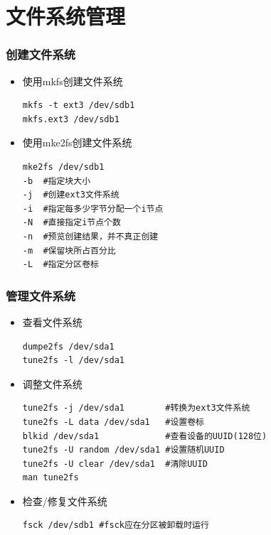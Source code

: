 \documentclass[xcolor=svgnames,presentation]{beamer}
\begin{document}
\section{文件系统管理}
\label{sec-2}
\begin{frame}[fragile]
\frametitle{创建文件系统}
\label{sec-2-1}
\begin{itemize}

\item 使用mkfs创建文件系统\\
\label{sec-2-1-1}%
\begin{verbatim}
mkfs -t ext3 /dev/sdb1
mkfs.ext3 /dev/sdb1
\end{verbatim}

\item 使用mke2fs创建文件系统\\
\label{sec-2-1-2}%
\begin{verbatim}
mke2fs /dev/sdb1
-b  #指定块大小
-j  #创建ext3文件系统
-i  #指定每多少字节分配一个i节点
-N  #直接指定i节点个数
-n  #预览创建结果，并不真正创建
-m  #保留块所占百分比
-L  #指定分区卷标
\end{verbatim}
\end{itemize} %
\end{frame}
\begin{frame}[fragile]
\frametitle{管理文件系统}
\label{sec-2-2}
\begin{itemize}

\item 查看文件系统\\
\label{sec-2-2-1}%
\begin{verbatim}
dumpe2fs /dev/sda1
tune2fs -l /dev/sda1
\end{verbatim}

\item 调整文件系统\\
\label{sec-2-2-2}%
\begin{verbatim}
tune2fs -j /dev/sda1        #转换为ext3文件系统
tune2fs -L data /dev/sda1   #设置卷标
blkid /dev/sda1             #查看设备的UUID(128位)
tune2fs -U random /dev/sda1 #设置随机UUID
tune2fs -U clear /dev/sda1  #清除UUID
man tune2fs
\end{verbatim}

\item 检查/修复文件系统\\
\label{sec-2-2-3}%
\begin{verbatim}
fsck /dev/sdb1 #fsck应在分区被卸载时运行
\end{verbatim}
\end{itemize} %
\end{frame}
\end{document}
